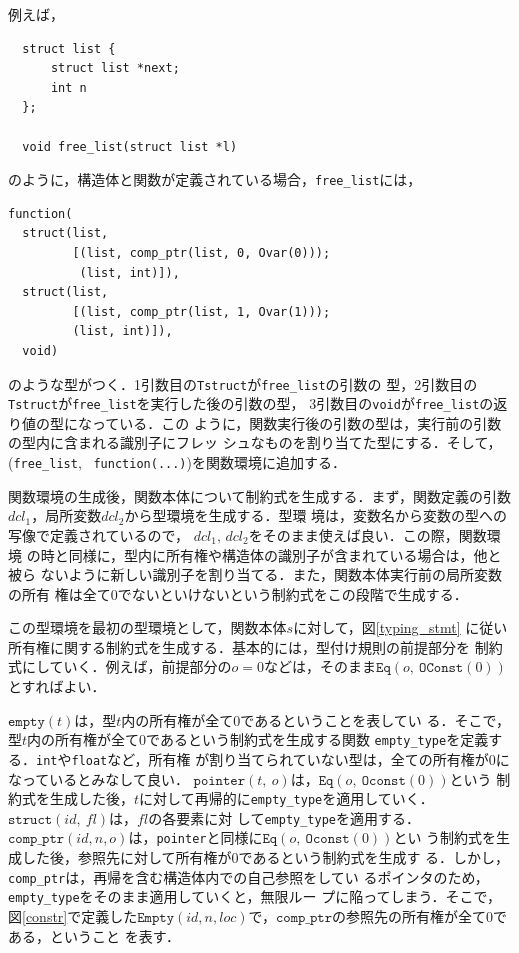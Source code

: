 \begin{example}[関数環境の生成]
例えば，
\begin{verbatim}
  struct list {
      struct list *next;
      int n
  };

  void free_list(struct list *l)
\end{verbatim}
のように，構造体と関数が定義されている場合，\texttt{free\_list}には，
\begin{verbatim}
function(
  struct(list,
         [(list, comp_ptr(list, 0, Ovar(0)));
          (list, int)]),
  struct(list,
         [(list, comp_ptr(list, 1, Ovar(1)));
         (list, int)]),
  void)
\end{verbatim}
のような型がつく．1引数目の\texttt{Tstruct}が\texttt{free\_list}の引数の
型，2引数目の\texttt{Tstruct}が\texttt{free\_list}を実行した後の引数の型，
3引数目の\texttt{void}が\texttt{free\_list}の返り値の型になっている．この
ように，関数実行後の引数の型は，実行前の引数の型内に含まれる識別子にフレッ
シュなものを割り当てた型にする．そして，(\texttt{free\_list},
\ \texttt{function(...)})を関数環境に追加する．\label{example1}
\end{example}

関数環境の生成後，関数本体について制約式を生成する．まず，関数定義の引数
$\mathit{dcl}_{1}$，局所変数$\mathit{dcl}_{2}$から型環境を生成する．型環
境は，変数名から変数の型への写像で定義されているので，
$\mathit{dcl}_{1},\,\mathit{dcl}_2$をそのまま使えば良い．この際，関数環境
の時と同様に，型内に所有権や構造体の識別子が含まれている場合は，他と被ら
ないように新しい識別子を割り当てる．また，関数本体実行前の局所変数の所有
権は全て0でないといけないという制約式をこの段階で生成する．

この型環境を最初の型環境として，関数本体$s$に対して，図\ref{typing_stmt}
に従い所有権に関する制約式を生成する．基本的には，型付け規則の前提部分を
制約式にしていく．例えば，前提部分の$o = 0$などは，そのまま$\texttt{Eq}(o,\
\texttt{OConst}(0))$とすればよい．

$\texttt{empty}(t)$は，型$t$内の所有権が全て$0$であるということを表してい
る．そこで，型$t$内の所有権が全て$0$であるという制約式を生成する関数
\texttt{empty\_type}を定義する．\texttt{int}や\texttt{float}など，所有権
が割り当てられていない型は，全ての所有権が$0$になっているとみなして良い．
$\texttt{pointer}(t,\ o)$は，$\texttt{Eq}(o,\ \texttt{Oconst}(0))$という
制約式を生成した後，$t$に対して再帰的に\texttt{empty\_type}を適用していく．
$\texttt{struct}(\mathit{id},\ \mathit{fl})$は，$\mathit{fl}$の各要素に対
して\texttt{empty\_type}を適用する．$\texttt{comp\_ptr}(\mathit{id}, n,
o)$は，\texttt{pointer}と同様に$\texttt{Eq}(o,\ \texttt{Oconst}(0))$とい
う制約式を生成した後，参照先に対して所有権が$0$であるという制約式を生成す
る．しかし，\texttt{comp\_ptr}は，再帰を含む構造体内での自己参照をしてい
るポインタのため，\texttt{empty\_type}をそのまま適用していくと，無限ルー
プに陥ってしまう．そこで，図\ref{constr}で定義した$\texttt{Empty}(id, n,
loc)$で，$\texttt{comp\_ptr}$の参照先の所有権が全て$0$である，ということ
を表す．

